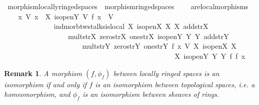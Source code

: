 \documentclass[12pt]{scrartcl}
\newtheorem{remark}[proposition]{Remark}
\begin{document}
\begin{isabelle}
\isamarkupfalse%
\ morphism{\isacharunderscore}{\kern0pt}locally{\isacharunderscore}{\kern0pt}ringed{\isacharunderscore}{\kern0pt}spaces\ {\isacharequal}{\kern0pt}\ morphism{\isacharunderscore}{\kern0pt}ringed{\isacharunderscore}{\kern0pt}spaces\ {\isacharplus}{\kern0pt}\isanewline
\ \ \ are{\isacharunderscore}{\kern0pt}local{\isacharunderscore}{\kern0pt}morphisms{\isacharcolon}{\kern0pt}\isanewline
\ \ \ \ {\isachardoublequoteopen}{\isasymAnd}x\ V{\isachardot}{\kern0pt}\ {\isasymlbrakk}x\ {\isasymin}\ X{\isacharsemicolon}{\kern0pt}\ is{\isacharunderscore}{\kern0pt}open\isactrlsub Y\ V{\isacharsemicolon}{\kern0pt}\ f\ x\ {\isasymin}\ V{\isasymrbrakk}\ {\isasymLongrightarrow}\ \isanewline
\ \ \ \ \ \ \ \ \ \ \ \ \ \ ind{\isacharunderscore}{\kern0pt}mor{\isacharunderscore}{\kern0pt}btw{\isacharunderscore}{\kern0pt}stalks{\isachardot}{\kern0pt}is{\isacharunderscore}{\kern0pt}local\ X\ is{\isacharunderscore}{\kern0pt}open\isactrlsub X\ {\isasymO}\isactrlsub X\ {\isasymrho}\isactrlsub X\ add{\isacharunderscore}{\kern0pt}str\isactrlsub X\ \isanewline
\ \ \ \ \ \ \ \ \ \ \ \ \ \ \ \ \ \ mult{\isacharunderscore}{\kern0pt}str\isactrlsub X\ zero{\isacharunderscore}{\kern0pt}str\isactrlsub X\ one{\isacharunderscore}{\kern0pt}str\isactrlsub X\ is{\isacharunderscore}{\kern0pt}open\isactrlsub Y\ {\isasymO}\isactrlsub Y\ {\isasymrho}\isactrlsub Y\ add{\isacharunderscore}{\kern0pt}str\isactrlsub Y\ \isanewline
\ \ \ \ \ \ \ \ \ \ \ \ \ \ \ \ \ \ \ \ \ \ mult{\isacharunderscore}{\kern0pt}str\isactrlsub Y\ zero{\isacharunderscore}{\kern0pt}str\isactrlsub Y\ one{\isacharunderscore}{\kern0pt}str\isactrlsub Y\ f\ x\ V\ {\isasymphi}\isactrlbsub X\ is{\isacharunderscore}{\kern0pt}open\isactrlsub X\ {\isasymO}\isactrlsub X\ \isanewline
\ \ \ \ \ \ \ \ \ \ \ \ \ \ \ \ \ \ \ \ \ \ \ \ \ \ \ \ \ \ \ \ \ \ \ \ \ \ \ \ \ \ \ \ \ \ \ \ {\isasymrho}\isactrlsub X\ is{\isacharunderscore}{\kern0pt}open\isactrlsub Y\ {\isasymO}\isactrlsub Y\ {\isasymrho}\isactrlsub Y\ f\ {\isasymphi}\isactrlsub f\ x\isactrlesub {\isachardoublequoteclose}
\end{isabelle}

\begin{remark}
	A morphism $(f, \phi_f)$ between locally ringed spaces is an isomorphism if and only if $f$ is an isomorphism between topological spaces, \textit{i.e.} a homeomorphism, and $\phi_f$ is an isomorphism between sheaves of rings.
\end{remark}
\end{document}
